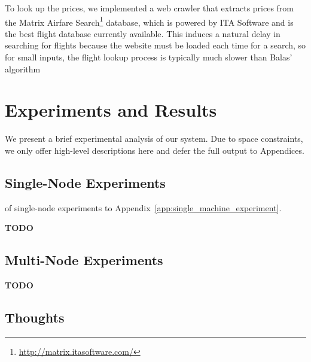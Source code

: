 \documentclass{article}
\begin{document}
To look up the prices, we implemented a web crawler that extracts prices from the Matrix Airfare Search\footnote{\url{http://matrix.itasoftware.com/}}
database, which is powered by ITA Software and is the best flight database currently available. This induces a natural delay in searching for flights
because the website must be loaded each time for a search, so for small inputs, the flight lookup process is typically much slower than Balas'
algorithm



\section{Experiments and Results}\label{sec:experiments_results}

We present a brief experimental analysis of our system. Due to space constraints, we only offer high-level descriptions here and defer the full output
to Appendices.

\subsection{Single-Node Experiments}\label{sec:single_experiment}

of single-node
experiments to Appendix~\ref{app:single_machine_experiment}.

{\bf TODO}

\subsection{Multi-Node Experiments}\label{sec:distributed_experiment}
{\bf TODO}

\subsection{Thoughts}
\end{document}
